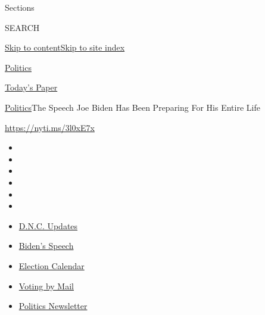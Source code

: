 Sections

SEARCH

\protect\hyperlink{site-content}{Skip to
content}\protect\hyperlink{site-index}{Skip to site index}

\href{https://www.nytimes3xbfgragh.onion/section/politics}{Politics}

\href{https://myaccount.nytimes3xbfgragh.onion/auth/login?response_type=cookie\&client_id=vi}{}

\href{https://www.nytimes3xbfgragh.onion/section/todayspaper}{Today's
Paper}

\href{/section/politics}{Politics}\textbar{}The Speech Joe Biden Has
Been Preparing For His Entire Life

\url{https://nyti.ms/3l0xE7x}

\begin{itemize}
\item
\item
\item
\item
\item
\item
\end{itemize}

\begin{itemize}
\item
  \href{https://www.nytimes3xbfgragh.onion/live/2020/08/20/us/dnc-convention-election?action=click\&pgtype=Article\&state=default\&region=TOP_BANNER\&context=storylines_menu}{D.N.C.
  Updates}
\item
  \href{https://www.nytimes3xbfgragh.onion/2020/08/20/us/politics/biden-presidential-nomination-dnc.html?action=click\&pgtype=Article\&state=default\&region=TOP_BANNER\&context=storylines_menu}{Biden's
  Speech}
\item
  \href{https://www.nytimes3xbfgragh.onion/interactive/2019/us/elections/2020-presidential-election-calendar.html?action=click\&pgtype=Article\&state=default\&region=TOP_BANNER\&context=storylines_menu}{Election
  Calendar}
\item
  \href{https://www.nytimes3xbfgragh.onion/interactive/2020/08/11/us/politics/vote-by-mail-us-states.html?action=click\&pgtype=Article\&state=default\&region=TOP_BANNER\&context=storylines_menu}{Voting
  by Mail}
\item
  \href{https://www.nytimes3xbfgragh.onion/newsletters/politics?action=click\&pgtype=Article\&state=default\&region=TOP_BANNER\&context=storylines_menu}{Politics
  Newsletter}
\end{itemize}

